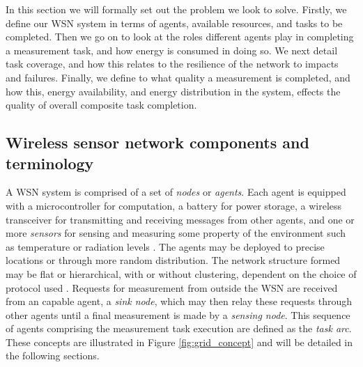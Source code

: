 In this section we will formally set out the problem we look to solve. Firstly, we define our WSN system in terms of agents, available resources, and tasks to be completed. Then we go on to look at the roles different agents play in completing a measurement task, and how energy is consumed in doing so. We next detail task coverage, and how this relates to the resilience of the network to impacts and failures. Finally, we define to what quality a measurement is completed, and how this, energy availability, and energy distribution in the system, effects the quality of overall composite task completion. 

\subsection{Wireless sensor network components and terminology}

A WSN system is comprised of a set of \textit{nodes} or \textit{agents}. Each agent is equipped with a microcontroller for computation, a battery for power storage, a wireless transceiver for  transmitting and receiving messages from other agents, and one or more \textit{sensors} for sensing and measuring some property of the environment such as temperature or radiation levels \citep{muhammad_r_ahmed_2012_1072589}. The agents may be deployed to precise locations or through more random distribution. The network structure formed may be flat or hierarchical, with or without clustering, dependent on the choice of protocol used \citep{Carlos-Mancilla2016b}. Requests for measurement from outside the WSN are received from an capable agent, a \textit{sink node}, which may then relay these requests through other agents until a final measurement is made by a \textit{sensing node}. This sequence of agents comprising the measurement task execution are defined as the \textit{task arc}. These concepts are illustrated in Figure \ref{fig:grid_concept} and will be detailed in the following sections.